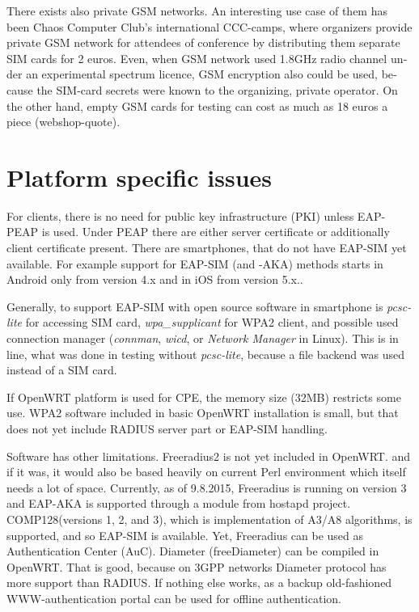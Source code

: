 \documentclass[12pt,a4paper,english]{tutthesis}
\begin{document}
\begin{otherlanguage}{english}
There exists also private GSM networks. An interesting use case
of them  has been Chaos Computer Club's international 
CCC-camps\cite{ccc}, where organizers 
provide private GSM network for attendees of conference
by distributing them separate SIM cards for 2 euros.  Even, when GSM
network used 1.8GHz radio channel under an experimental spectrum
licence,  GSM encryption also could be used, because the SIM-card secrets were known
to the organizing, private operator.
On the other hand, empty GSM cards for testing can cost as much as 
18 euros a piece (webshop-quote\cite{smartjac-testsim}).


\section{Platform specific issues}
\label{sec-6-3}

For clients, there is no need for public key infrastructure (PKI) 
unless EAP-PEAP is used. Under PEAP there are either server
certificate or additionally client certificate present.
There are smartphones, that do not have EAP-SIM yet available.
For example support for
EAP-SIM (and -AKA) methods starts in Android only from version 4.x and in
iOS from version 5.x.\cite{sim-support}.


Generally, to support EAP-SIM  with open source software in 
smartphone is \emph{pcsc-lite} for accessing SIM card, \emph{wpa\_supplicant} for
WPA2 client, and possible used connection manager (\emph{connman},
\emph{wicd}, or \emph{Network Manager} in Linux). This is in line, what was done in testing without \emph{pcsc-lite},
because a file backend was used instead of a SIM card.





If OpenWRT platform  is used for CPE, the memory size (32MB) restricts some
use.
WPA2 software included in basic OpenWRT installation is small,
but that does not yet include RADIUS server part or EAP-SIM handling.


Software has other limitations. Freeradius2 is not yet included  in OpenWRT.
and if it was, it would also be based heavily on current Perl environment which
itself needs a lot of space.
Currently, as of 9.8.2015, Freeradius is running on version 3 and
EAP-AKA is supported through a module from hostapd project.
COMP128(versions 1, 2, and 3), which is implementation  of A3/A8
algorithms, is  supported\cite{freeradius2}, and so EAP-SIM is available.
Yet, Freeradius can be used as Authentication Center (AuC).
Diameter (freeDiameter) can be compiled in OpenWRT. That is good,
because on 3GPP networks Diameter protocol has more support than RADIUS.
If nothing else works, as a backup old-fashioned WWW-authentication
portal can be used for offline authentication.



\end{otherlanguage}
\end{document}
